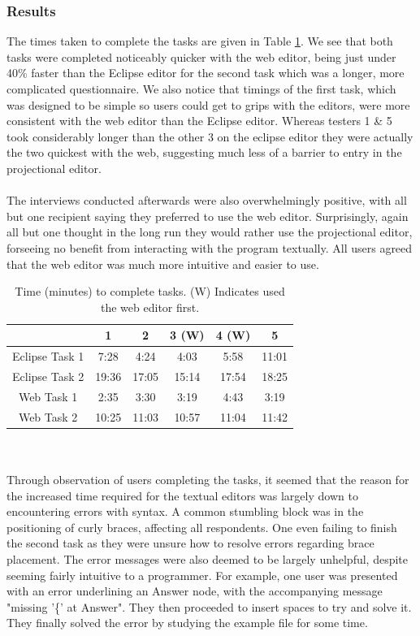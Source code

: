 \documentclass{article}
\begin{document}
{\subsubsection{Results}
The times taken to complete the tasks are given in Table \ref{Tab:questionnaireResults}. We see that both tasks were completed noticeably quicker with the web editor, being just under 40\% faster than the Eclipse editor for the second task which was a longer, more complicated questionnaire. We also notice that timings of the first task, which was designed to be simple so users could get to grips with the editors, were more consistent with the web editor than the Eclipse editor. Whereas testers 1 \& 5 took considerably longer than the other 3 on the eclipse editor they were actually the two quickest with the web, suggesting much less of a barrier to entry in the projectional editor.  
\\
\\
The interviews conducted afterwards were also overwhelmingly positive, with all but one recipient saying they preferred to use the web editor. Surprisingly, again all but one thought in the long run they would rather use the projectional editor, forseeing no benefit from interacting with the program textually. All users agreed that the web editor was much more intuitive and easier to use.
\begin{table}[ht]
\centering
	\begin{tabular}{| c | c | c | c | c | c |}
	\hline
	& 1  & 2 & 3 (W) & 4 (W) & 5 \\
	\hline 
	Eclipse Task 1 & 7:28 & 4:24 & 4:03 & 5:58 & 11:01 \\
	Eclipse Task 2 & 19:36 & 17:05 & 15:14 & 17:54 & 18:25 \\
	Web Task 1 & 2:35 & 3:30 & 3:19 & 4:43 & 3:19 \\
	Web Task 2 & 10:25 & 11:03 & 10:57 & 11:04 & 11:42 \\
	\hline
	\end{tabular}
	\caption{Time (minutes) to complete tasks. (W) Indicates used the web editor first.}
	\label{Tab:questionnaireResults}
\end{table}
\\
\\
Through observation of users completing the tasks, it seemed that the reason for the increased time required for the textual editors was largely down to encountering errors with syntax. A common stumbling block was in the positioning of curly braces, affecting all respondents. One even failing to finish the second task as they were unsure how to resolve errors regarding brace placement. The error messages were also deemed to be largely unhelpful, despite seeming fairly intuitive to a programmer. For example, one user was presented with an error underlining an Answer node, with the accompanying message "missing '\{' at Answer". They then proceeded to insert spaces to try and solve it. They finally solved the error by studying the example file for some time. 
}
\end{document}
